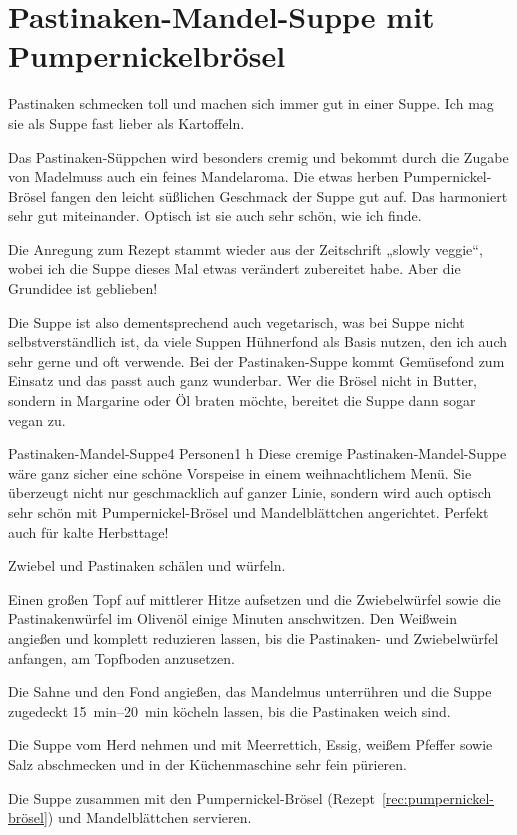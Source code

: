 \section{Pastinaken-Mandel-Suppe mit Pumpernickelbrösel}
Pastinaken schmecken toll und machen sich immer gut in einer Suppe. Ich mag sie als Suppe fast lieber als Kartoffeln.

Das Pastinaken-Süppchen wird besonders cremig und bekommt durch die Zugabe von Madelmuss auch ein feines Mandelaroma. Die etwas herben Pumpernickel-Brösel fangen den leicht süßlichen Geschmack der Suppe gut auf. Das harmoniert sehr gut miteinander. Optisch ist sie auch sehr schön, wie ich finde.

Die Anregung zum Rezept stammt wieder aus der Zeitschrift „slowly veggie“, wobei ich die Suppe dieses Mal etwas verändert zubereitet habe. Aber die Grundidee ist geblieben!

Die Suppe ist also dementsprechend auch vegetarisch, was bei Suppe nicht selbstverständlich ist, da viele Suppen Hühnerfond als Basis nutzen, den ich auch sehr gerne und oft verwende. Bei der Pastinaken-Suppe kommt Gemüsefond zum Einsatz und das passt auch ganz wunderbar. Wer die Brösel nicht in Butter, sondern in Margarine oder Öl braten möchte, bereitet die Suppe dann sogar vegan zu.\autocite{malte_2017}

\begin{recipe}{Pastinaken-Mandel-Suppe}{4 Personen}{1 h}
    \freeform Diese cremige Pastinaken-Mandel-Suppe wäre ganz sicher eine schöne Vorspeise in einem weihnachtlichem Menü. Sie überzeugt nicht nur geschmacklich auf ganzer Linie, sondern wird auch optisch sehr schön mit Pumpernickel-Brösel und Mandelblättchen angerichtet. Perfekt auch für kalte Herbsttage!

    Zwiebel und Pastinaken schälen und würfeln.

    Einen großen Topf auf mittlerer Hitze aufsetzen und die Zwiebelwürfel sowie die Pastinakenwürfel im Olivenöl einige Minuten anschwitzen. Den Weißwein angießen und komplett reduzieren lassen, bis die Pastinaken- und Zwiebelwürfel anfangen, am Topfboden anzusetzen.

    Die Sahne und den Fond angießen, das Mandelmus unterrühren und die Suppe zugedeckt \SIrange{15}{20}{\minute} köcheln lassen, bis die Pastinaken weich sind.

    Die Suppe vom Herd nehmen und mit Meerrettich, Essig, weißem Pfeffer sowie Salz abschmecken und in der Küchenmaschine sehr fein pürieren.

    Die Suppe zusammen mit den Pumpernickel-Brösel (Rezept~\ref{rec:pumpernickel-brösel}) und Mandelblättchen servieren.
    \freeform\hrulefill
\end{recipe}

